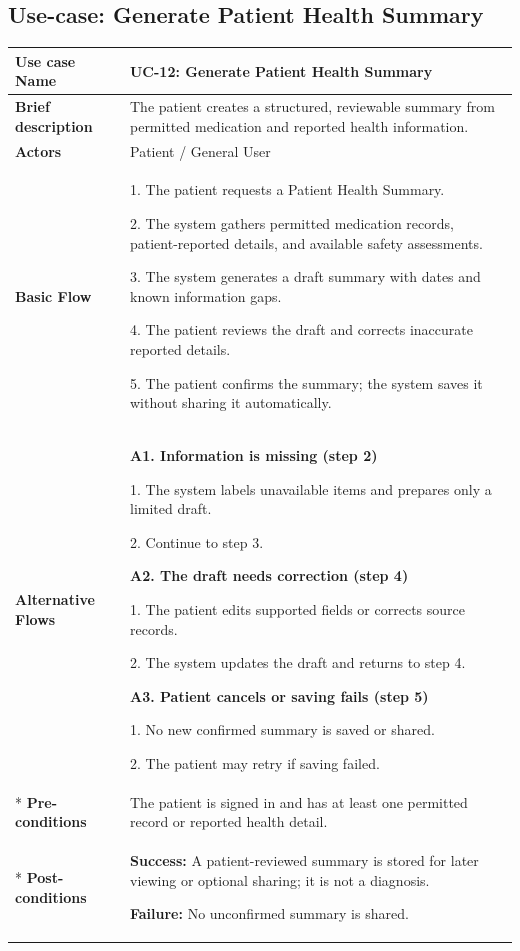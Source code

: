 \clearpage
\subsection{Use-case: Generate Patient Health Summary}
\label{uc:uc-12}

\begin{longtable}{|p{}|p{}|}
\hline
\textbf{Use case Name} & UC-12: Generate Patient Health Summary \\ \hline
\textbf{Brief description} & The patient creates a structured, reviewable summary from permitted medication and reported health information. \\ \hline
\textbf{Actors} & Patient / General User \\ \hline
\textbf{Basic Flow} &
1. The patient requests a Patient Health Summary.\par
2. The system gathers permitted medication records, patient-reported details, and available safety assessments.\par
3. The system generates a draft summary with dates and known information gaps.\par
4. The patient reviews the draft and corrects inaccurate reported details.\par
5. The patient confirms the summary; the system saves it without sharing it automatically.
\\ \hline
\textbf{Alternative Flows} &
\textbf{A1. Information is missing (step 2)}\par
1. The system labels unavailable items and prepares only a limited draft.\par
2. Continue to step 3.
\par
\textbf{A2. The draft needs correction (step 4)}\par
1. The patient edits supported fields or corrects source records.\par
2. The system updates the draft and returns to step 4.
\par
\textbf{A3. Patient cancels or saving fails (step 5)}\par
1. No new confirmed summary is saved or shared.\par
2. The patient may retry if saving failed.
\\* \hline
\textbf{Pre-conditions} & The patient is signed in and has at least one permitted record or reported health detail. \\* \hline
\textbf{Post-conditions} & \textbf{Success:} A patient-reviewed summary is stored for later viewing or optional sharing; it is not a diagnosis.\par
\textbf{Failure:} No unconfirmed summary is shared. \\ \hline
\end{longtable}

